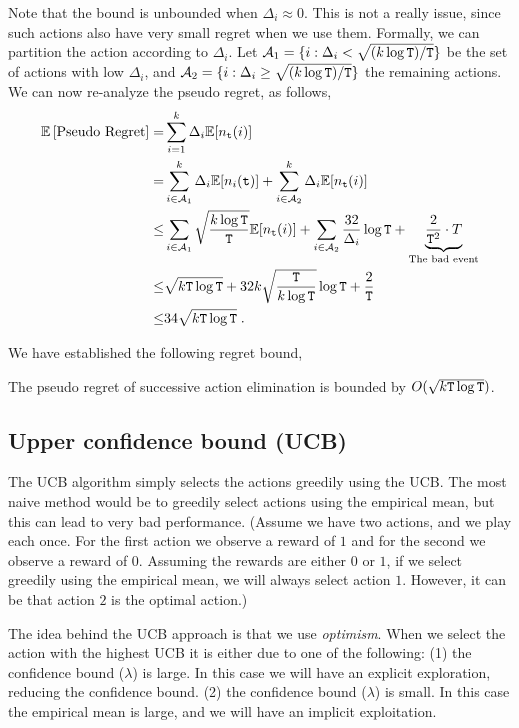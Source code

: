 Note that the bound is unbounded when $\Delta_i\approx 0$. This is not a really issue, since such actions also have very small regret when we use them. Formally, we can partition the action according to $\Delta_i$. Let $\mathcal{A}_1=\{i:\Delta_i< \sqrt{(k\log{\tt T})/{\tt T}}\}$ be the set of actions with low $\Delta_i$, and $\mathcal{A}_2=\{i:\Delta_i\geq \sqrt{(k\log{\tt T})/{\tt T}}\}$ the remaining actions. We can now re-analyze the pseudo regret, as follows,
\begin{align*}
\mathbb{E}\left[\text{Pseudo Regret}\right]  = &  \sum_{i=1}^{k}\Delta_{i}\mathbb{E}[n_{{\tt t}}(i)]\\
= &  \sum_{i\in \mathcal{A}_1}^{k}\Delta_{i}\mathbb{E}[n_{i}({\tt t})]+ \sum_{i\in \mathcal{A}_2}^{k}\Delta_{i}\mathbb{E}[n_{{\tt t}}(i)]\\
  \le & \sum_{i\in\mathcal{A}_1}\sqrt{\frac{k\log{\tt T}}{{\tt T}}}\mathbb{E}[n_{{\tt t}}(i)] +\sum_{i\in\mathcal{A}_2}\frac{32}{\Delta_{i}}\log {\tt T}
  +\underbrace{\frac{2}{{\tt T}^{2}}\cdot T}_{\text{The bad event}}\\
  \leq & \sqrt{k{\tt T}\log{\tt T}}+ 32 k \sqrt{\frac{{\tt T}}{k\log {\tt T}}}\log{\tt T}+ \frac{2}{{\tt T}}\\
  \leq & 34  \sqrt{k{\tt T}\log{\tt T}}\;.
\end{align*}

We have established the following regret bound,
\begin{theorem}
\label{thm:MAB:SE2}
The pseudo regret of successive action elimination is bounded by $O( \sqrt{k{\tt T}\log{\tt T}})$.
\end{theorem}


\subsection{Upper confidence bound (UCB)}

The UCB algorithm simply selects the actions greedily using the UCB. The most naive method would be to greedily select actions using the empirical mean, but this can lead to very bad performance. (Assume we have two actions, and we play each once. For the first action we observe a reward of $1$ and for the second we observe a reward of $0$. Assuming the rewards are either  $0$ or $1$, if we select greedily using the empirical mean, we will always select action $1$. However, it can be that action $2$ is the optimal action.)


The idea behind the UCB approach is that we use \emph{optimism}. When we select the action with the highest UCB it is either due to one of the following: (1) the confidence bound ($\lambda$) is large. In this case we will have an explicit exploration, reducing the confidence bound. (2) the confidence bound ($\lambda$) is small. In this case the empirical mean is large, and we will have an implicit exploitation.

